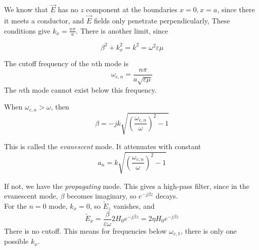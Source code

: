 \documentclass[12pt]{article}
\begin{document}
We know that $\vec E$ has no $z$ component at the boundaries $x=0,x=a$, since there it meets a conductor, and $\vec E$ fields only penetrate perpendicularly, These conditions give $k_x = \frac{n\pi}{a}$. There is another limit, since

$$\beta^2 + k_x^2 = k^2 = \omega^2\varepsilon\mu$$

\begin{defn}
    The cutoff frequency of the $n$th mode is
    $$\omega_{c,n} = \frac{n\pi}{a\sqrt{\varepsilon\mu}}$$
    The $n$th mode cannot exist below this frequency.
\end{defn}

When $\omega_{c,n} > \omega$, then
$$\beta = -jk\sqrt{\left(\frac{\omega_{c,n}}{\omega}\right)^2 - 1}$$

This is called the \textit{evanescent} mode. It attenuates with constant
$$a_n = k\sqrt{\left(\frac{\omega_{c,n}}{\omega}\right)^2 - 1}$$

If not, we have the \textit{propagating} mode. This gives a high-pass filter, since in the evanescent mode, $\beta$ becomes imaginary, so $e^{-j\beta z}$ decays. \\

For the $n = 0$ mode, $k_x = 0$, so $\tilde E_z$ vanishes, and
$$\tilde E_x = \frac{\beta}{\varepsilon\omega} 2H_0e^{-j\beta z} = 2\eta H_0e^{-j\beta z}$$
There is no cutoff. This means for frequencies below $\omega_{c,1}$, there is only one possible $k_x$.
\end{document}
